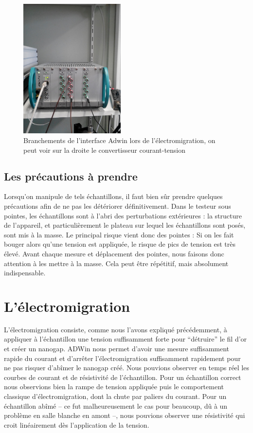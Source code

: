 \begin{figure}[h]
    \begin{center}
        \includegraphics[trim=0mm 0mm 80px 600px, clip, width=200px]{Photos/Branchements_ADWin.jpg}
        \caption{Branchements de l'interface Adwin lors de l'électromigration, on peut voir sur la droite le convertisseur courant-tension}
        \label{fig:}
    \end{center}
\end{figure}


\subsection{Les précautions à prendre}
Lorsqu'on manipule de tels échantillons, il faut bien sûr prendre quelques précautions afin de ne pas les détériorer définitivement.
Dans le testeur sous pointes, les échantillons sont à l'abri des perturbations extérieures : la structure de l'appareil, et particulièrement le plateau sur lequel les échantillons sont posés, sont mis à la masse.
Le principal risque vient donc des pointes : Si on les fait bouger alors qu'une tension est appliquée, le risque de pics de tension est très élevé. Avant chaque mesure et déplacement des pointes, nous faisons donc attention à les mettre à la masse. Cela peut être répétitif, mais absolument indispensable. 

\section{L'électromigration}
L'électromigration consiste, comme nous l'avons expliqué précédemment, à appliquer à l'échantillon une tension suffisamment forte pour “détruire” le fil d'or et créer un nanogap.
ADWin nous permet d'avoir une mesure suffisamment rapide du courant et d'arrêter l'électromigration suffisamment rapidement pour ne pas risquer d'abîmer le nanogap créé.
Nous pouvions observer en temps réel les courbes de courant et de résistivité de l'échantillon. Pour un échantillon correct nous observions bien la rampe de tension appliquée puis le comportement classique d'électromigration, dont la chute par paliers du courant.
Pour un échantillon abîmé -- ce fut malheureusement le cas pour beaucoup, dû à un problème en salle blanche en amont --, nous pouvions observer une résistivité qui croit linéairement dès l'application de la tension.
